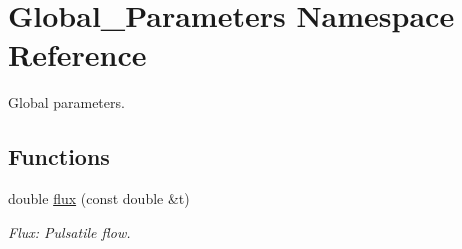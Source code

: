 \hypertarget{namespaceGlobal__Parameters}{}\section{Global\+\_\+\+Parameters Namespace Reference}
\label{namespaceGlobal__Parameters}


Global parameters.  


\subsection*{Functions}
\begin{DoxyCompactItemize}
\item 
double \hyperlink{namespaceGlobal__Parameters_a536aa5314a6cdb36af852e9513351d55}{flux} (const double \&t)
\begin{DoxyCompactList}\small\item\em Flux\+: Pulsatile flow. \end{DoxyCompactList}\end{DoxyCompactItemize}
